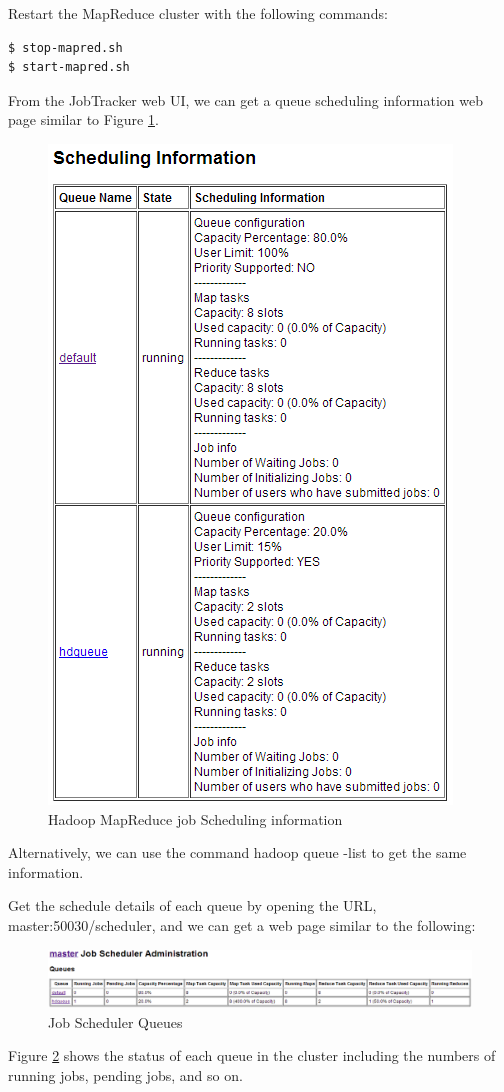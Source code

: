 Restart the MapReduce cluster with the following commands:
\lstset{style=bashstyle}
\begin{lstlisting}
$ stop-mapred.sh
$ start-mapred.sh
\end{lstlisting}

From the JobTracker web UI, we can get a queue scheduling information web page similar to Figure \ref{fig:mapred.scheduling}.
\begin{figure}[ht]
  \centering
  \includegraphics[width=.55\textwidth]{figs/5163os_04_17.png}
  \caption{Hadoop MapReduce job Scheduling information}\label{fig:mapred.scheduling}
\end{figure} 
Alternatively, we can use the command hadoop queue -list to get the same information. 

Get the schedule details of each queue by opening the URL, master:50030/scheduler, and we can get a web page similar to the following: 
\begin{figure}[ht]
  \centering
  \includegraphics[width=.90\textwidth]{figs/5163os_04_18.png}
  \caption{Job Scheduler Queues}\label{fig:job.queues}
\end{figure} 
 Figure \ref{fig:job.queues} shows the status of each queue in the cluster including the numbers of running jobs, pending jobs, and so on. 

